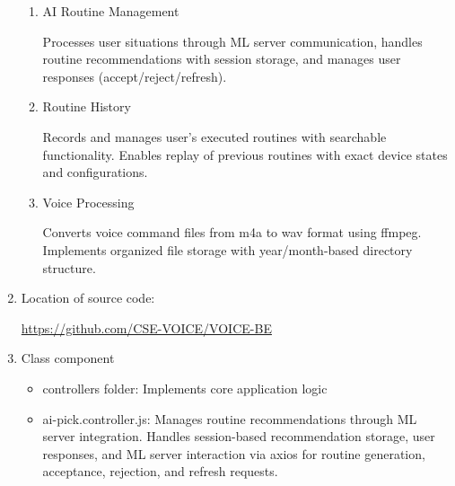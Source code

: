 \documentclass[conference]{IEEEtran}
\begin{document}
\begin{enumerate}[label=\arabic*]
\begin{enumerate}[label=\arabic*)]
        \item AI Routine Management\par
        \vspace{0.3em}
        Processes user situations through ML server communication, handles routine recommendations with session storage, and manages user responses (accept/reject/refresh).

        \vspace{1em}

        \item Routine History\par
        \vspace{0.3em}
        Records and manages user's executed routines with searchable functionality. Enables replay of previous routines with exact device states and configurations.

        \vspace{1em}

        \item Voice Processing\par
        \vspace{0.3em}
        Converts voice command files from m4a to wav format using ffmpeg. Implements organized file storage with year/month-based directory structure.
    \end{enumerate}

    \vspace{1em}

    \item Location of source code:\par
    \vspace{0.3em}
    \href{https://github.com/CSE-VOICE/VOICE-BE}{https://github.com/CSE-VOICE/VOICE-BE}

    \vspace{1em}

    \item Class component\par
    \vspace{0.3em}

    \begin{itemize}[label=-]
        \item controllers folder: Implements core application logic
        \vspace{0.7em}

        \item ai-pick.controller.js: Manages routine recommendations through ML server integration. Handles session-based recommendation storage, user responses, and ML server interaction via axios for routine generation, acceptance, rejection, and refresh requests.
        \vspace{0.7em}


\end{itemize}
\end{enumerate}
\end{document}
